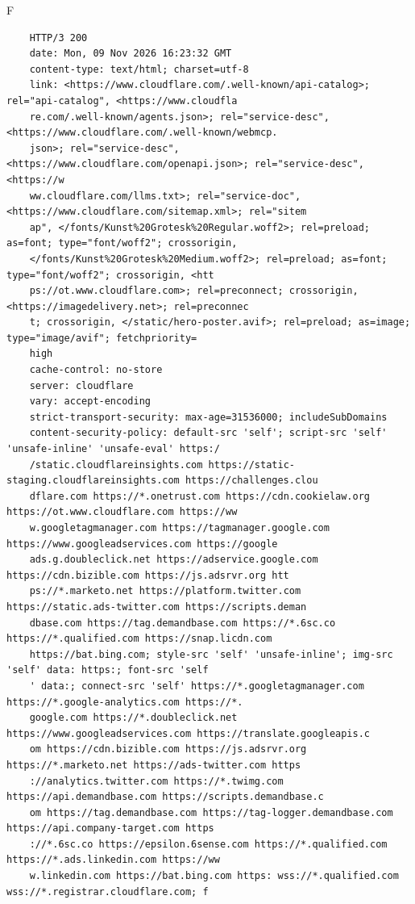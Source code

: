 \begin{maintask}{F}
\begin{termout}[H]
\begin{verbatim}
    HTTP/3 200 
    date: Mon, 09 Nov 2026 16:23:32 GMT
    content-type: text/html; charset=utf-8
    link: <https://www.cloudflare.com/.well-known/api-catalog>; rel="api-catalog", <https://www.cloudfla
    re.com/.well-known/agents.json>; rel="service-desc", <https://www.cloudflare.com/.well-known/webmcp.
    json>; rel="service-desc", <https://www.cloudflare.com/openapi.json>; rel="service-desc", <https://w
    ww.cloudflare.com/llms.txt>; rel="service-doc", <https://www.cloudflare.com/sitemap.xml>; rel="sitem
    ap", </fonts/Kunst%20Grotesk%20Regular.woff2>; rel=preload; as=font; type="font/woff2"; crossorigin,
    </fonts/Kunst%20Grotesk%20Medium.woff2>; rel=preload; as=font; type="font/woff2"; crossorigin, <htt
    ps://ot.www.cloudflare.com>; rel=preconnect; crossorigin, <https://imagedelivery.net>; rel=preconnec
    t; crossorigin, </static/hero-poster.avif>; rel=preload; as=image; type="image/avif"; fetchpriority=
    high
    cache-control: no-store
    server: cloudflare
    vary: accept-encoding
    strict-transport-security: max-age=31536000; includeSubDomains
    content-security-policy: default-src 'self'; script-src 'self' 'unsafe-inline' 'unsafe-eval' https:/
    /static.cloudflareinsights.com https://static-staging.cloudflareinsights.com https://challenges.clou
    dflare.com https://*.onetrust.com https://cdn.cookielaw.org https://ot.www.cloudflare.com https://ww
    w.googletagmanager.com https://tagmanager.google.com https://www.googleadservices.com https://google
    ads.g.doubleclick.net https://adservice.google.com https://cdn.bizible.com https://js.adsrvr.org htt
    ps://*.marketo.net https://platform.twitter.com https://static.ads-twitter.com https://scripts.deman
    dbase.com https://tag.demandbase.com https://*.6sc.co https://*.qualified.com https://snap.licdn.com
    https://bat.bing.com; style-src 'self' 'unsafe-inline'; img-src 'self' data: https:; font-src 'self
    ' data:; connect-src 'self' https://*.googletagmanager.com https://*.google-analytics.com https://*.
    google.com https://*.doubleclick.net https://www.googleadservices.com https://translate.googleapis.c
    om https://cdn.bizible.com https://js.adsrvr.org https://*.marketo.net https://ads-twitter.com https
    ://analytics.twitter.com https://*.twimg.com https://api.demandbase.com https://scripts.demandbase.c
    om https://tag.demandbase.com https://tag-logger.demandbase.com https://api.company-target.com https
    ://*.6sc.co https://epsilon.6sense.com https://*.qualified.com https://*.ads.linkedin.com https://ww
    w.linkedin.com https://bat.bing.com https: wss://*.qualified.com wss://*.registrar.cloudflare.com; f

\end{verbatim}
\end{termout}
\end{maintask}
